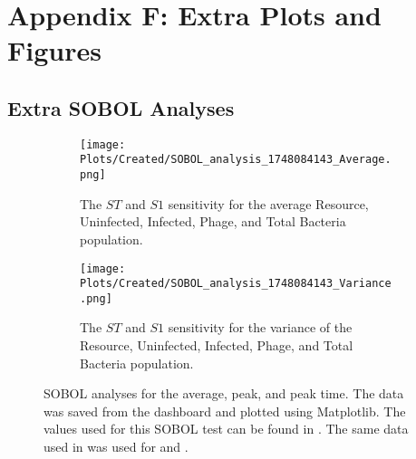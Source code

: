 \chapter{Appendix F: Extra Plots and Figures}
\label{AppendixF}

\section{Extra SOBOL Analyses}
\label{sec:AppendixF:extra_SOBOL_analyses}

\begin{figure}
    \centering
    \begin{subfigure}{0.49\linewidth}
        \centering
        \captionsetup{width=1\linewidth}
        \texttt{[image: Plots/Created/SOBOL\_analysis\_1748084143\_Average.png]}
        \caption{
            The $ST$ and $S1$ sensitivity for the average Resource, Uninfected, Infected, Phage, and Total Bacteria population. 
        }
        \label{fig:created:SOBOL_average_extra}
    \end{subfigure}
    \hfill
    \begin{subfigure}{0.49\linewidth}
        \centering
        \captionsetup{width=1\linewidth}
        \texttt{[image: Plots/Created/SOBOL\_analysis\_1748084143\_Variance.png]}
        \caption{
            The $ST$ and $S1$ sensitivity for the variance of the Resource, Uninfected, Infected, Phage, and Total Bacteria population. 
        }
        \label{fig:created:SOBOL_variance_extra}
    \end{subfigure}
    \caption{
        SOBOL analyses for the average, peak, and peak time. 
        The data was saved from the dashboard and plotted using Matplotlib. 
        The values used for this SOBOL test can be found in . 
        The same data used in  was used for  and . 
    }
    \label{fig:created:SOBOL_extra}
\end{figure}


